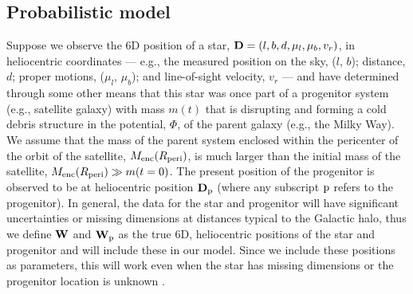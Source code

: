 \documentclass[letterpaper,12pt,preprint]{aastex}
\newcommand{\D}{{\bf D}}
\newcommand{\W}{{\bf W}}
\newcommand{\sat}{{\rm p}}
\begin{document}
\subsection{Probabilistic model}
Suppose we observe the 6D position of a star, $\D = (l,b,d,\mu_l,\mu_b,v_r)$, in heliocentric coordinates --- e.g., the measured position on the sky, ($l$, $b$); distance, $d$; proper motions, ($\mu_l$, $\mu_b$); and line-of-sight velocity, $v_r$ --- and have determined through some other means that this star was once part of a progenitor system (e.g., satellite galaxy) with mass $m(t)$ that is disrupting and forming a cold debris structure in the potential, $\Phi$, of the parent galaxy (e.g., the Milky Way). We assume that the mass of the parent system enclosed within the pericenter of the orbit of the satellite, $M_{\rm enc}(R_{\rm peri})$, is much larger than the initial mass of the satellite, $M_{\rm enc}(R_{\rm peri})\gg m(t=0)$. The present position of the progenitor is observed to be at heliocentric position $\D_\sat$ (where any subscript $\sat$ refers to the progenitor). In general, the data for the star and progenitor will have significant uncertainties or missing dimensions at distances typical to the Galactic halo, thus we define $\W$ and $\W_\sat$ as the true 6D, heliocentric positions of the star and progenitor and will include these in our model. Since we include these positions as parameters, this will work even when the star has missing dimensions or the progenitor location is unknown \citep[as in the Orphan stream,][]{belokurov07}.
\end{document}
